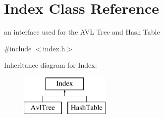 \hypertarget{class_index}{\section{Index Class Reference}
\label{class_index}
}


an interface used for the A\-V\-L Tree and Hash Table  




{\ttfamily \#include $<$index.\-h$>$}

Inheritance diagram for Index\-:\begin{figure}[H]
\begin{center}
\leavevmode
\includegraphics[height=2.000000cm]{class_index}
\end{center}
\end{figure}
